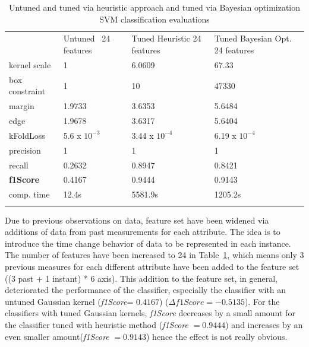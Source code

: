 \begin{table}
	\centering
\caption{Untuned and tuned via heuristic approach and tuned via Bayesian optimization SVM classification evaluations}
\label{tab:contSurfStuckAddedFeat}       %
\begin{tabular}{p{2.6cm}p{2cm}p{2.5cm}p{2.7cm}}
\hline\noalign{\smallskip}
 & Untuned \ 24 features & Tuned Heuristic 24 features & Tuned Bayesian Opt. 24 features\\
\noalign{\smallskip}\hline\noalign{\smallskip}
kernel scale & 1 & 6.0609 & 67.33 \\
box constraint & 1 & 10 &  47330\\
margin & 1.9733 & 3.6353 & 5.6484 \\
edge & 1.9678 & 3.6317 & 5.6404 \\
kFoldLoss & 5.6 x $10^{-3}$ & 3.44 x $10^{-4}$ & 6.19 x $10^{-4}$ \\
precision & 1 & 1 & 1 \\
recall & 0.2632 & 0.8947 & 0.8421\\
\textbf{f1Score} & 0.4167 & 0.9444 & 0.9143 \\
comp. time & 12.4s & 5581.9s &1205.2s \\
\noalign{\smallskip}\hline
\end{tabular}
\end{table}


Due to previous observations on data, feature set have been widened via additions of data from past measurements for each attribute. 
The idea is to introduce the time change behavior of data to be represented in each instance. 
The number of features have been increased to 24 in Table~\ref{tab:contSurfStuckAddedFeat}, which means only 3 previous measures for each different attribute have been added to the feature set ((3 past + 1 instant) * 6 axis).
This addition to the feature set, in general, deteriorated the performance of the classifier, especially the classifier with an untuned Gaussian kernel (\emph{f1Score}= $0.4167$) ($\Delta f1Score = -0.5135$). 
For the classifiers with tuned Gaussian kernels, \emph{f1Score} decreases by a small amount for the classifier tuned with heuristic method (\emph{f1Score} $= 0.9444$) and increases by an even smaller amount(\emph{f1Score} $= 0.9143$) hence the effect is not really obvious. 

